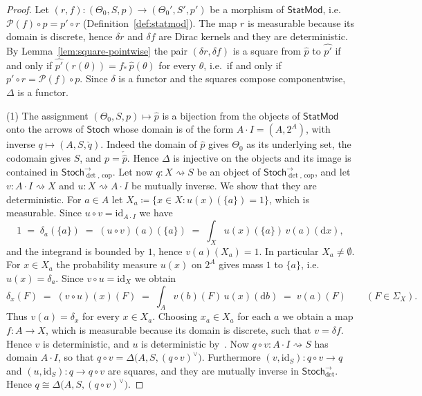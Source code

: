 \documentclass[11pt,a4paper]{article}
\theoremstyle{plain}
\theoremstyle{definition}
\theoremstyle{remark}
\newcommand{\cat}[1]{\mathsf{#1}}
\newcommand{\Stoch}{\cat{Stoch}}
\newcommand{\Prb}{\mathcal{P}}
\newcommand{\id}{\mathrm{id}}
\newcommand{\del}{\delta}
\newcommand{\StatMod}{\cat{StatMod}}
\newcommand{\Jc}{\Delta}
\newcommand{\Arrdet}[1]{#1^{\rightarrow}_{\det}}
\newcommand{\Arrcop}[1]{#1^{\rightarrow}_{\det,\,\mathrm{cop}}}
\begin{document}
\begin{proof}
Let $(r,f) \colon (\Theta_0,S,p) \to (\Theta_0',S',p')$ be a morphism of
$\StatMod$, i.e.\ $\Prb(f) \circ p = p' \circ r$
(Definition~\ref{def:statmod}). The map $r$ is measurable because its domain is
discrete, hence $\del r$ and $\del f$ are Dirac kernels and they are
deterministic. By Lemma~\ref{lem:square-pointwise} the pair
$(\del r,\del f)$ is a square from $\widehat p$ to $\widehat{p'}$ if and only
if $\widehat{p'}(r(\theta)) = f_{*}\,\widehat p(\theta)$ for every $\theta$,
i.e.\ if and only if $p' \circ r = \Prb(f) \circ p$. Since $\del$ is a functor
and the squares compose componentwise, $\Jc$ is a functor.

(1) The assignment $(\Theta_0,S,p) \mapsto \widehat p$ is a bijection from the
objects of $\StatMod$ onto the arrows of $\Stoch$ whose domain is of the form
$A \cdot I = (A,2^{A})$, with inverse $q \mapsto (A,S,\check q)$. Indeed the
domain of $\widehat p$ gives $\Theta_0$ as its underlying set, the codomain
gives $S$, and $p = \check{\widehat p}$. Hence $\Jc$ is injective on the
objects and its image is contained in $\Arrcop{\Stoch}$. Let now
$q \colon X \rightsquigarrow S$ be an object of $\Arrcop{\Stoch}$, and let
$v \colon A \cdot I \rightsquigarrow X$ and
$u \colon X \rightsquigarrow A \cdot I$ be mutually inverse. We show that they
are deterministic. For $a \in A$ let
$X_a \coloneqq \{x \in X : u(x)(\{a\}) = 1\}$, which is measurable. Since
$u \circ v = \id_{A \cdot I}$ we have
\[
1 \;=\; \delta_a(\{a\}) \;=\; (u \circ v)(a)(\{a\})
\;=\; \int_X u(x)(\{a\})\, v(a)(\mathrm{d}x),
\]
and the integrand is bounded by $1$, hence $v(a)(X_a) = 1$. In particular
$X_a \neq \emptyset$. For $x \in X_a$ the probability measure $u(x)$ on $2^{A}$
gives mass $1$ to $\{a\}$, i.e.\ $u(x) = \delta_a$. Since $v \circ u = \id_X$
we obtain
\[
\delta_x(F) \;=\; (v \circ u)(x)(F)
\;=\; \int_A v(b)(F)\, u(x)(\mathrm{d}b) \;=\; v(a)(F)
\qquad (F \in \Sigma_X).
\]
Thus $v(a) = \delta_x$ for every $x \in X_a$. Choosing $x_a \in X_a$ for each
$a$ we obtain a map $f \colon A \to X$, which is measurable because its domain
is discrete, such that $v = \del f$. Hence $v$ is deterministic, and $u$ is
deterministic by~\cite[Lem.~10.9(c)]{fritz_synthetic_2020}. Now
$q \circ v \colon A \cdot I \rightsquigarrow S$ has domain $A \cdot I$, so that
$q \circ v = \Jc\bigl(A, S, (q \circ v)^{\vee}\bigr)$. Furthermore
$(v, \id_S) \colon q \circ v \to q$ and $(u, \id_S) \colon q \to q \circ v$ are
squares, and they are mutually inverse in $\Arrdet{\Stoch}$. Hence
$q \cong \Jc\bigl(A,S,(q \circ v)^{\vee}\bigr)$.


\end{proof}
\end{document}
